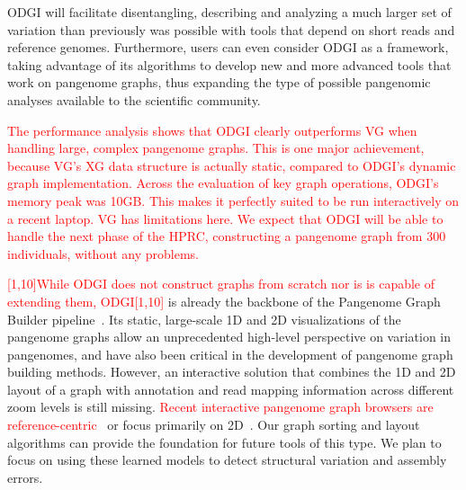 \documentclass{bioinfo}
\newcommand{\REVIEWED}[1]{{\textcolor{Red}{#1}}}
\begin{document}
ODGI will facilitate disentangling,
describing and analyzing a much larger set of variation than previously was possible with tools that depend on short reads and reference genomes.
Furthermore, users can even consider ODGI as a framework, taking advantage of its algorithms to develop new and more advanced tools that work on pangenome graphs,
thus expanding the type of possible pangenomic analyses available to the scientific community.

\REVIEWED{The performance analysis shows that ODGI clearly outperforms VG when handling large, complex pangenome graphs. This is one major achievement, because VG's XG data structure is actually static, compared to ODGI's dynamic graph implementation. Across the evaluation of key graph operations, ODGI's memory peak was 10GB. This makes it perfectly suited to be run interactively on a recent laptop. VG has limitations here. We expect that ODGI will be able to handle the next phase of the HPRC, constructing a pangenome graph from 300 individuals, without any problems.}

\REVIEWED{[1,10]While ODGI does not construct graphs from scratch nor is is capable of extending them, ODGI[1,10]} is already the backbone of the Pangenome Graph Builder pipeline~\citep{pggb}.
Its static, large-scale 1D and 2D visualizations of the pangenome graphs allow an unprecedented high-level perspective on variation in pangenomes, and have also been critical in the development of pangenome graph building methods.  %
However, an interactive solution that combines the 1D and 2D layout of a graph with annotation and read mapping information across different zoom levels is still missing.
\REVIEWED{Recent interactive pangenome graph browsers are reference-centric}~\citep{Beyer2019, Yokoyama2019, Durant2021} or focus primarily on 2D~\citep{Wick_2015, Gonnella2018}.
Our graph sorting and layout algorithms can provide the foundation for future tools of this type.
We plan to focus on using these learned models to detect structural variation and assembly errors.
\end{document}
